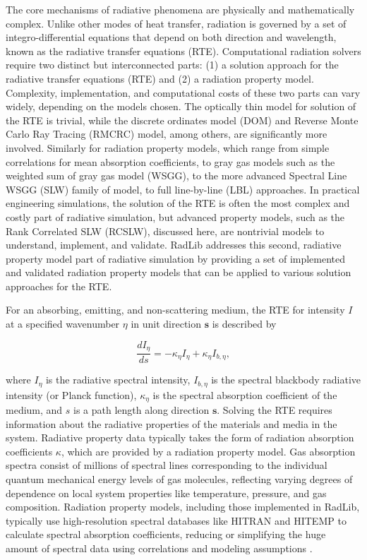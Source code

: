 \documentclass[preprint,12pt]{elsarticle}
\newcounter{bla}
\begin{document}
The core mechanisms of radiative phenomena are physically and mathematically complex. Unlike other modes of heat transfer, radiation is governed by a set of integro-differential equations that depend on both direction and wavelength, known as the radiative transfer equations (RTE). Computational radiation solvers require two distinct but interconnected parts: (1) a solution approach for the radiative transfer equations (RTE) and (2) a radiation property model. 
Complexity, implementation, and computational costs of these two parts can vary widely, depending on the models chosen. The optically thin model for solution of the RTE is trivial, while the discrete ordinates model (DOM) and Reverse Monte Carlo Ray Tracing (RMCRC) model, among others, are significantly more involved. Similarly for radiation property models, which range from simple correlations for mean absorption coefficients, to gray gas models such as the weighted sum of gray gas model (WSGG), to the more advanced Spectral Line WSGG (SLW) family of model, to full line-by-line (LBL) approaches. In practical engineering simulations, the solution of the RTE is often the most complex and costly part of radiative simulation, but advanced property models, such as the Rank Correlated SLW (RCSLW), discussed here, are nontrivial models to understand, implement, and validate.
RadLib addresses this second, radiative property model part of radiative simulation by providing a set of implemented and validated radiation property models that can be applied to various solution approaches for the RTE. 

For an absorbing, emitting, and non-scattering medium, the RTE for intensity $I$ at a specified wavenumber $\eta$ in unit direction $\mathbf{s}$ is described by
% 
\begin{linenomath}
\begin{equation} \label{e:RTE_general}
    \frac{dI_{\eta}}{ds} = -\kappa_{\eta}I_{\eta} + \kappa_{\eta}I_{b,\eta},
\end{equation}
\end{linenomath}
%
where $I_{\eta}$ is the radiative spectral intensity, $I_{b,\eta}$ is the spectral blackbody radiative intensity (or Planck function), $\kappa_{\eta}$ is the spectral absorption coefficient of the medium, and $s$ is a path length along direction $\mathbf{s}$. Solving the RTE requires information about the radiative properties of the materials and media in the system. Radiative property data typically takes the form of radiation absorption coefficients $\kappa$, which are provided by a radiation property model. Gas absorption spectra consist of millions of spectral lines corresponding to the individual quantum mechanical energy levels of gas molecules, reflecting varying degrees of dependence on local system properties like temperature, pressure, and gas composition. Radiation property models, including those implemented in RadLib, typically use high-resolution spectral databases like HITRAN and HITEMP \cite{Rothman_2010} to calculate spectral absorption coefficients, reducing or simplifying the huge amount of spectral data using correlations and modeling assumptions \citep{Zhang_2002b}. 
\end{document}
